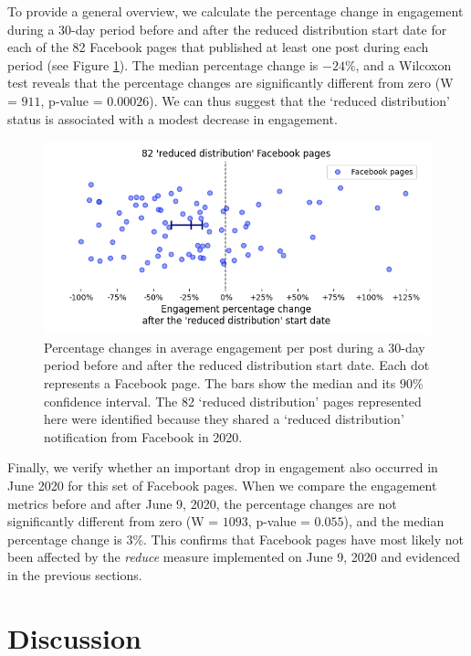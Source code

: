 \documentclass[review]{elsarticle}
\begin{document}
{To provide a general overview, we calculate the percentage change in engagement during a 30-day period before and after the reduced distribution start date for each of the 82 Facebook pages that published at least one post during each period (see Figure \ref{reduce_percentage_change}).
The median percentage change is $-24\%$, and a Wilcoxon test reveals that the percentage changes are significantly different from zero (W = $911$, p-value = $0.00026$).
We can thus suggest that the `reduced distribution' status is associated with a modest decrease in engagement.

\begin{figure}[!h]
\centering
\includegraphics[scale=0.5]{./../figure/reduce_percentage_change.png}
\caption{
Percentage changes in average engagement per post during a 30-day period before and after the reduced distribution start date. 
Each dot represents a Facebook page. 
The bars show the median and its $90\%$ confidence interval.
The 82 `reduced distribution' pages represented here were identified because they shared a `reduced distribution' notification from Facebook in 2020.
}
\label{reduce_percentage_change}
\end{figure}
 
Finally, we verify whether an important drop in engagement also occurred in June 2020 for this set of Facebook pages.
When we compare the engagement metrics before and after June 9, 2020, the percentage changes are not significantly different from zero (W = $1093$, p-value = $0.055$), and the median percentage change is $3\%$.
This confirms that Facebook pages have most likely not been affected by the {\it reduce} measure implemented on June 9, 2020 and evidenced in the previous sections.

\section{Discussion}

}
\end{document}
